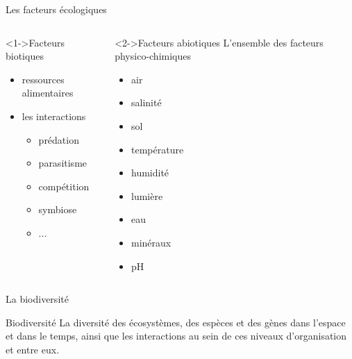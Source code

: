 \documentclass[10pt]{beamer}
\begin{document}
\begin{frame}{Les facteurs écologiques}
  \begin{columns}
    \begin{column}[c]{0.5\textwidth}
     \begin{block}<1->{Facteurs biotiques}
       \begin{itemize}
        \item ressources alimentaires
        \item les interactions
          \begin{itemize}
          \item prédation
          \item parasitisme
          \item compétition
          \item symbiose
          \item ...
          \end{itemize}
        \end{itemize}
    \end{block}
   \end{column}
    \begin{column}[c]{0.5\textwidth}
      \begin{block}<2->{Facteurs abiotiques}
        L'ensemble des facteurs physico-chimiques
        \begin{itemize}
        \item air
        \item salinité
        \item sol
        \item température
        \item humidité
        \item lumière
        \item eau
        \item minéraux
        \item pH
        \end{itemize}
    \end{block}
    \end{column}
  \end{columns}
\end{frame}




\begin{frame}{La biodiversité}
  \begin{center}
    \begin{exampleblock}{Biodiversité}
   La diversité des écosystèmes, des espèces et des gènes dans l'espace et dans le temps, ainsi que les interactions au sein de ces niveaux d'organisation et entre eux.
 \end{exampleblock}
 \end{center}
\end{frame}
\end{document}
